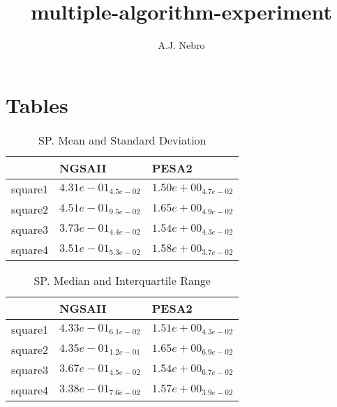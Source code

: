 \documentclass{article}
\title{multiple-algorithm-experiment}
\author{A.J. Nebro}
\begin{document}
\maketitle
\section{Tables}

\begin{table}
\caption{SP. Mean and Standard Deviation}
\label{table: SP}
\centering
\begin{scriptsize}
\begin{tabular}{lll}
\hline & NGSAII &  PESA2\\
\hline 
square1 & \cellcolor{gray95}$  4.31e-01_{ 4.5e-02}$ & \cellcolor{gray25}$  1.50e+00_{ 4.7e-02}$ \\
square2 & \cellcolor{gray95}$  4.51e-01_{ 9.5e-02}$ & \cellcolor{gray25}$  1.65e+00_{ 4.9e-02}$ \\
square3 & \cellcolor{gray95}$  3.73e-01_{ 4.4e-02}$ & \cellcolor{gray25}$  1.54e+00_{ 4.3e-02}$ \\
square4 & \cellcolor{gray95}$  3.51e-01_{ 5.3e-02}$ & \cellcolor{gray25}$  1.58e+00_{ 3.7e-02}$ \\
\hline
\end{tabular}
\end{scriptsize}
\end{table}

\begin{table}
\caption{SP. Median and Interquartile Range}
\label{table: SP}
\centering
\begin{scriptsize}
\begin{tabular}{lll}
\hline & NGSAII &  PESA2\\
\hline 
square1 & \cellcolor{gray95}$  4.33e-01_{ 6.1e-02}$ & \cellcolor{gray25}$  1.51e+00_{ 4.3e-02}$ \\
square2 & \cellcolor{gray95}$  4.35e-01_{ 1.2e-01}$ & \cellcolor{gray25}$  1.65e+00_{ 6.9e-02}$ \\
square3 & \cellcolor{gray95}$  3.67e-01_{ 4.5e-02}$ & \cellcolor{gray25}$  1.54e+00_{ 6.7e-02}$ \\
square4 & \cellcolor{gray95}$  3.38e-01_{ 7.6e-02}$ & \cellcolor{gray25}$  1.57e+00_{ 3.9e-02}$ \\
\hline
\end{tabular}
\end{scriptsize}
\end{table}
\end{document}
